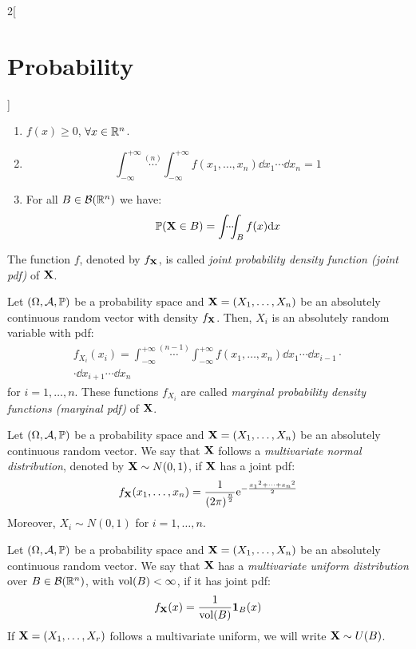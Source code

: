\documentclass[../../../main.tex]{subfiles}
\begin{document}
\begin{multicols}{2}[\section{Probability}]
\begin{definition}
    \begin{enumerate}
      \item $f(x)\geq 0$, $\forall x\in\mathbb{R}^n$.
      \item \hfill $$\int_{-\infty}^{+\infty}\overset{(n)}{\cdots}\int_{-\infty}^{+\infty} f(x_1,\ldots,x_n)\dd x_1\cdots\dd x_n=1$$
      \item For all $B\in\mathcal{B}(\mathbb{R}^n)$ we have: $$\Prob(\vf{X}\in B)=\dotsint_Bf(x)\dd x$$
    \end{enumerate}
    The function $f$, denoted by $f_{\boldsymbol{\mathrm{X}}}$, is called \textit{joint probability density function (joint pdf)} of $\boldsymbol{\mathrm{X}}$.
  \end{definition}
  \begin{prop}
    Let $(\Omega,\mathcal{A},\mathbb{P})$ be a probability space and $\boldsymbol{\mathrm{X}}=(X_1,\ldots,X_n)$ be an absolutely continuous random vector with density $f_{\boldsymbol{\mathrm{X}}}$. Then, $X_i$ is an absolutely random variable with pdf:
    \begin{multline*}
      f_{X_i}(x_i)=\int_{-\infty}^{+\infty}\overset{(n-1)}{\cdots}\int_{-\infty}^{+\infty} f(x_1,\ldots,x_n)\dd x_1\cdots\dd x_{i-1}\cdot\\\cdot\dd x_{i+1}\cdots\dd x_n
    \end{multline*}
    for $i=1,\ldots, n$. These functions $f_{X_i}$ are called \textit{marginal probability density functions (marginal pdf)} of $\boldsymbol{\mathrm{X}}$.
  \end{prop}
  \begin{definition}
    Let $(\Omega,\mathcal{A},\mathbb{P})$ be a probability space and $\boldsymbol{\mathrm{X}}=(X_1,\ldots,X_n)$ be an absolutely continuous random vector. We say that $\boldsymbol{\mathrm{X}}$ follows a \textit{multivariate normal distribution}, denoted by $\boldsymbol{\mathrm{X}}\sim N(0,1)$, if $\boldsymbol{\mathrm{X}}$ has a joint pdf: $$f_{\boldsymbol{\mathrm{X}}}(x_1,\ldots,x_n)=\frac{1}{{(2\pi)}^{\frac{n}{2}}}\mathrm{e}^{-\frac{{x_1}^2+\cdots+{x_n}^2}{2}}$$ Moreover, $X_i\sim N(0,1)$ for $i=1,\ldots,n$.
  \end{definition}
  \begin{definition}
    Let $(\Omega,\mathcal{A},\mathbb{P})$ be a probability space and $\boldsymbol{\mathrm{X}}=(X_1,\ldots,X_n)$ be an absolutely continuous random vector. We say that $\boldsymbol{\mathrm{X}}$ has a \textit{multivariate uniform distribution} over $B\in\mathcal{B}(\mathbb{R}^n)$, with $\operatorname{vol}(B)<\infty$, if it has joint pdf: $$f_{\boldsymbol{\mathrm{X}}}(x)=\frac{1}{\operatorname{vol}(B)}\boldsymbol{\mathrm{1}}_B(x)$$ If $\boldsymbol{\mathrm{X}}=(X_1,\ldots,X_r)$ follows a multivariate uniform, we will write $\boldsymbol{\mathrm{X}}\sim U(B)$.

\end{definition}
\end{multicols}
\end{document}
